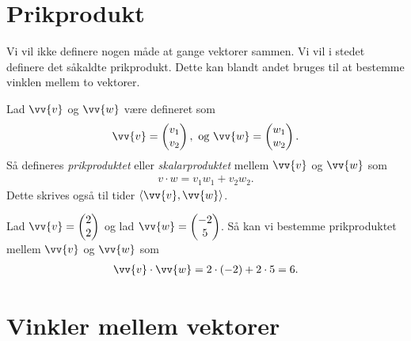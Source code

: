 \newpage

\section*{Prikprodukt}

Vi vil ikke definere nogen måde at gange vektorer sammen. Vi vil i stedet definere det såkaldte prikprodukt. Dette kan blandt andet bruges til at bestemme vinklen mellem to vektorer. 
\begin{defn}
Lad $\vv{v}$ og $\vv{w}$ være defineret som
\begin{align*}
\vv{v} = \begin{pmatrix}
v_1\\ v_2
\end{pmatrix}, \textnormal{ og }\vv{w} = \begin{pmatrix}w_1 \\ w_2
\end{pmatrix}.
\end{align*}
Så defineres \textit{prikproduktet} eller \textit{skalarproduktet} mellem $\vv{v}$ og $\vv{w}$ som
\begin{align*}
v\cdot w = v_1w_1 + v_2w_2.
\end{align*}
Dette skrives også til tider $\langle \vv{v}, \vv{w} \rangle$. 
\end{defn}
\begin{exa}
Lad $\vv{v} = \begin{pmatrix}
2 \\ 2
\end{pmatrix}$ og lad $\vv{w} = \begin{pmatrix}
-2 \\ 5
\end{pmatrix}$. Så kan vi bestemme prikproduktet mellem $\vv{v}$ og $\vv{w}$ som
\begin{align*}
\vv{v} \cdot \vv{w} = 2\cdot(-2)+2\cdot 5 = 6.
\end{align*}
\end{exa}

\section*{Vinkler mellem vektorer}

